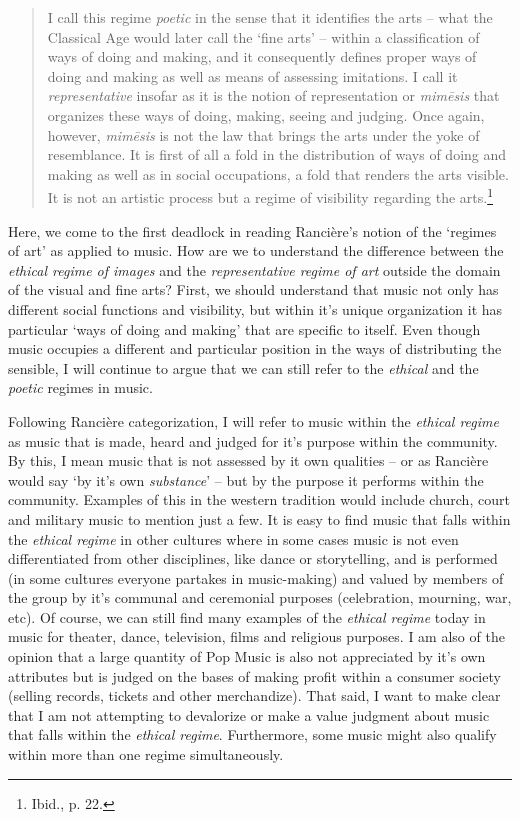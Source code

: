 \begin{quote}
I call this regime \emph{poetic} in the sense that it identifies the arts -- what the Classical Age would later call the `fine arts' -- within a classification of ways of doing and making, and it consequently defines proper ways of doing and making as well as means of assessing imitations. I call it \emph{representative} insofar as it is the notion of representation or \emph{mim\={e}sis} that organizes these ways of doing, making, seeing and judging. Once again, however, \emph{mim\={e}sis} is not the law that brings the arts under the yoke of resemblance. It is first of all a fold in the distribution of ways of doing and making as well as in social occupations, a fold that renders the arts visible. It is not an artistic process but a regime of visibility regarding the arts.\footnote{Ibid., p. 22.}
\end{quote}

Here, we come to the first deadlock in reading Ranci\`{e}re's notion of the `regimes of art' as applied to music. How are we to understand the difference between the \emph{ethical regime of images} and the \emph{representative regime of art} outside the domain of the visual and fine arts? First, we should understand that music not only has different social functions and visibility, but within it's unique organization it has particular `ways of doing and making' that are specific to itself. Even though music occupies a different and particular position in the ways of distributing the sensible, I will continue to argue that we can still refer to the \emph{ethical} and the \emph{poetic} regimes in music. 

Following Ranci\`{e}re categorization, I will refer to music within the \emph{ethical regime} as music that is made, heard and judged for it's purpose within the community. By this, I mean music that is not assessed by it own qualities -- or as Ranci\`{e}re would say `by it's own \emph{substance}' -- but by the purpose it performs within the community. Examples of this in the western tradition would include church, court and military music to mention just a few. It is easy to find music that falls within the \emph{ethical regime} in other cultures where in some cases music is not even differentiated from other disciplines, like dance or storytelling, and is performed (in some cultures everyone partakes in music-making) and valued by members of the group by it's communal and ceremonial purposes (celebration, mourning, war, etc). Of course, we can still find many examples of the \emph{ethical regime} today in music for theater, dance, television, films and religious purposes. I am also of the opinion that a large quantity of Pop Music is also not appreciated by it's own attributes but is judged on the bases of making profit within a consumer society (selling records, tickets and other merchandize). That said, I want to make clear that I am not attempting to devalorize or make a value judgment about music that falls within the \emph{ethical regime}. Furthermore, some music might also qualify within more than one regime simultaneously.

